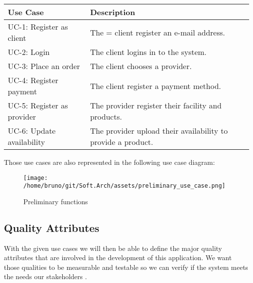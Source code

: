 \begin{table}[htb]
    \begin{tabularx}{\textwidth}{lX}
    \toprule
    Use Case & Description  \\
    \midrule
    UC-1: Register as \gls{client} & The = \gls{client} register an e-mail address.\\
    UC-2: Login & The \gls{client} logins in to the system. \\
    UC-3: Place an order & The \gls{client} chooses a \gls{provider}. \\
    UC-4: Register payment & The \gls{client} register a payment method. \\
    UC-5: Register as \gls{provider} & The \gls{provider} register their facility and products. \\
    UC-6: Update availability & The \gls{provider} upload their availability to provide a product. \\
    \bottomrule
    \end{tabularx}
\end{table}

Those use cases are also represented in the following use case diagram:

\begin{figure}[htb]
    \centering
    \texttt{[image: /home/bruno/git/Soft.Arch/assets/preliminary\_use\_case.png]}
    \caption{Preliminary functions}
    \label{fig:predes}
\end{figure}


\subsection{Quality Attributes}

With the given use cases we will then be able to define the major quality attributes that are involved in the 
development of this application. We want those qualities to be measurable and testable so we can verify if the 
system meets the needs our stakeholders \cite{refbook:DSHC}.

